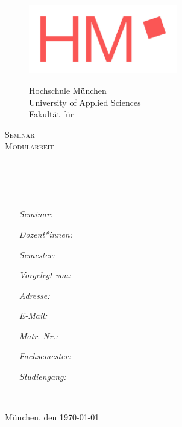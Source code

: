
\begin{titlepage}

\begin{center}

\begin{figure}[htbp]
\begin{minipage}[t]{7cm}
\vspace{0pt}
\centering
\includegraphics[height=3cm]{source/images/hmlogo}	
\end{minipage}
\hfill
\begin{minipage}[t]{7cm}
\vspace{0.6cm}
\textcolor{hmred}{Hochschule M\"unchen \\
University of Applied Sciences \\
Fakult\"at f\"ur \\ \Fachbereich}
\end{minipage}
\end{figure}

\vspace{1cm}
\textsc{\Large Seminar \Labor}\\[0.6cm]
\textsc{\Large Modularbeit}\\[0.8cm]

\HRule\\[0.8cm]
{ \huge \bfseries \TitelArbeit}\\[0.2cm]
{ \large \UntertitelArbeit}\\[0.3cm]
\HRule \\[1cm]

\begin{minipage}[t]{\textwidth}
	\begin{itemize}[labelwidth={1em}]
	\setlength\itemsep{-0.3em}
	\item[\emph{Seminar:}] \Labor
	\item[\emph{Dozent*innen:}] \Prof 
	\item[\emph{Semester:}] \Semester
	\item[\emph{Vorgelegt von:}] \Author
	\item[\emph{Adresse:}] \Adresse
	\item[\emph{E-Mail:}] \Email
	\item[\emph{Matr.-Nr.:}] \Matrikelnummer
	\item[\emph{Fachsemester:}] \Fachsemester
	\item[\emph{Studiengang:}] \Studiengang
	\end{itemize}
\end{minipage} \\[0.9cm]

\begin{flushright}
	M\"unchen, den \today
\end{flushright}

\end{center}
\end{titlepage}
